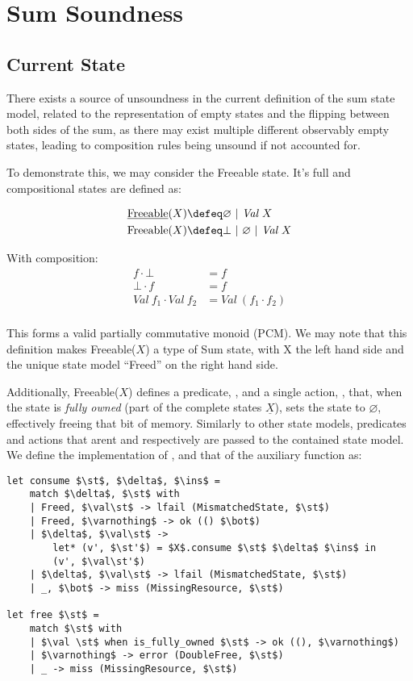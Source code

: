 \chapter{Sum Soundness}

\section{Current State}

There exists a source of unsoundness in the current definition of the sum state model, related to the representation of empty states and the flipping between both sides of the sum, as there may exist multiple different observably empty states, leading to composition rules being unsound if not accounted for.

To demonstrate this, we may consider the Freeable state. It's full and compositional states are defined as:

\newcommand{\val}[0]{\textit{Val}~}

\begin{align*}
	\text{\underline{Freeable}}(X) &\defeq \varnothing ~|~\val X\\
	\text{Freeable}(X) &\defeq \bot ~|~ \varnothing ~|~ \val X
\end{align*}

With composition:
\begin{align*}
	f \cdot \bot &= f\\
	\bot \cdot f &= f\\
	\val f_1 \cdot \val f_2 &= \val (f_1\cdot f_2)\\
\end{align*}

This forms a valid partially commutative monoid (PCM). We may note that this definition makes Freeable($X$) a type of Sum state, with X the left hand side and the unique state model ``Freed'' on the right hand side. 

Additionally, Freeable($X$) defines a predicate, , and a single action, , that, when the state is \textit{fully owned} (part of the complete states $\underline{X}$), sets the state to $\varnothing$, effectively freeing that bit of memory. Similarly to other state models, predicates and actions that arent  and  respectively are passed to the contained state model. We define the implementation of ,  and that of the auxiliary  function as:

\begin{lstlisting}
let consume $\st$, $\delta$, $\ins$ =
	match $\delta$, $\st$ with
	| Freed, $\val\st$ -> lfail (MismatchedState, $\st$)
	| Freed, $\varnothing$ -> ok (() $\bot$)
	| $\delta$, $\val\st$ ->
		let* (v', $\st'$) = $X$.consume $\st$ $\delta$ $\ins$ in
		(v', $\val\st'$)
	| $\delta$, $\val\st$ -> lfail (MismatchedState, $\st$)
	| _, $\bot$ -> miss (MissingResource, $\st$)

let free $\st$ =
	match $\st$ with
	| $\val \st$ when is_fully_owned $\st$ -> ok ((), $\varnothing$)
	| $\varnothing$ -> error (DoubleFree, $\st$)
	| _ -> miss (MissingResource, $\st$)
\end{lstlisting}

